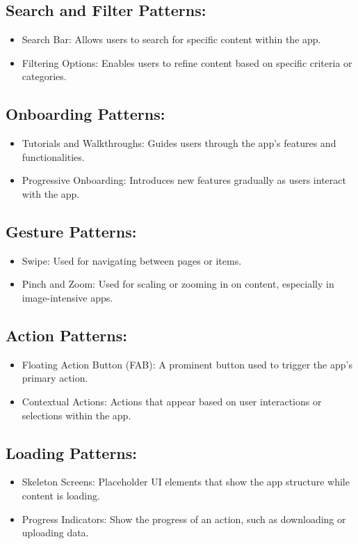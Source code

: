 \documentclass[12pt,a4paper]{article}
\begin{document}
\subsection{Search and Filter Patterns:}
\begin{itemize}
\item Search Bar: Allows users to search for specific content within the app.
\item Filtering Options: Enables users to refine content based on specific criteria or categories.
\end{itemize}

\subsection{Onboarding Patterns:}
\begin{itemize}
\item Tutorials and Walkthroughs: Guides users through the app's features and functionalities.
\item Progressive Onboarding: Introduces new features gradually as users interact with the app.
\end{itemize}

\subsection{Gesture Patterns:}
\begin{itemize}
\item Swipe: Used for navigating between pages or items.
\item Pinch and Zoom: Used for scaling or zooming in on content, especially in image-intensive apps.
\end{itemize}

\subsection{ Action Patterns:}
\begin{itemize}
\item Floating Action Button (FAB): A prominent button used to trigger the app's primary action.
\item Contextual Actions: Actions that appear based on user interactions or selections within the app.
\end{itemize}

\subsection{Loading Patterns:}
\begin{itemize}
\item Skeleton Screens: Placeholder UI elements that show the app structure while content is loading.
\item Progress Indicators: Show the progress of an action, such as downloading or uploading data.
\end{itemize}
\end{document}

